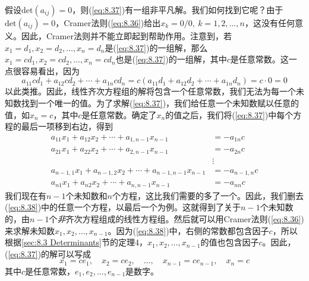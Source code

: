     假设$\mathrm{det}\left(a_{ij}\right) = 0$，则(\ref{eq:8.37})有一组非平凡解。我们如何找到它呢？由于$\mathrm{det}\left(a_{ij}\right) = 0$，Cramer法则(\ref{eq:8.36})给出$x_k = 0/0, \: k = 1,2,\ldots,n$，这没有任何意义。因此，Cramer法则并不能立即起到帮助作用。注意到，若$x_1=d_1,x_2=d_2,\ldots,x_n=d_n$是(\ref{eq:8.37})的一组解，那么$x_1=cd_1,x_2=cd_2,\ldots,x_n=cd_n$也是(\ref{eq:8.37})的一组解，其中$c$是任意常数。这一点很容易看出，因为
    \begin{equation*}
        a_{11}cd_1 + a_{12}cd_2 + \cdots + a_{1n}cd_n = c\left(a_{11}d_1 + a_{12}d_2 + \cdots + a_{1n}d_n\right) = c\cdot 0 = 0
    \end{equation*}
    以此类推。因此，线性齐次方程组的解将包含一个任意常数，我们无法为每一个未知数找到一个唯一的值。为了求解(\ref{eq:8.37})，我们给任意一个未知数赋以任意的值，如$x_n=c$，其中$c$是任意常数。确定了$x_n$的值之后，我们将(\ref{eq:8.37})中每个方程的最后一项移到右边，得到
    \begin{equation}
        \begin{aligned}
            a_{11}x_1 + a_{12}x_2 + \cdots + a_{1,n-1}x_{n-1} &= -a_{1n}c \\
            a_{21}x_1 + a_{22}x_2 + \cdots + a_{2,n-1}x_{n-1} &= -a_{2n}c \\
            &\vdots \\
            a_{n-1,1}x_1 + a_{n-1,2}x_2 + \cdots + a_{n-1,n-1}x_{n-1} &= -a_{n-1,n}c \\
            a_{n1}x_1 + a_{n2}x_2 + \cdots + a_{n,n-1}x_{n-1} &= -a_{nn}c
        \end{aligned}
        \label{eq:8.38}
    \end{equation}
    我们现在有$n-1$个未知数和$n$个方程，这比我们需要的多了一个。因此，我们删去(\ref{eq:8.38})中的任意一个方程，以最后一个为例。这就得到了关于$n-1$个未知数的，由$n-1$个\textit{非}齐次方程组成的线性方程组。然后就可以用Cramer法则(\ref{eq:8.36})来求解未知数$x_1,x_2,\ldots,x_{n-1}$。因为(\ref{eq:8.38})中，右侧的常数都包含因子$c$，所以根据\ref{sec:8.3 Determinants}节的定理4，$x_1,x_2,\ldots,x_{n-1}$的值也包含因子$c$。因此，(\ref{eq:8.37})的解可以写成
    \begin{equation}
        x_1 = ce_1, \quad x_2 = ce_2, \quad \ldots, \quad x_{n-1} = ce_{n-1}, \quad x_n = c
        \label{eq:8.39}
    \end{equation}
    其中$c$是任意常数，$e_1,e_2,\ldots,e_{n-1}$是数字。

